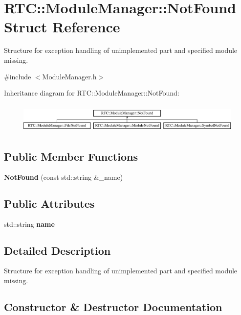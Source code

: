 \section{RTC::ModuleManager::NotFound Struct Reference}
\label{structRTC_1_1ModuleManager_1_1NotFound}


Structure for exception handling of unimplemented part and specified module missing.  




{\ttfamily \#include $<$ModuleManager.h$>$}

Inheritance diagram for RTC::ModuleManager::NotFound:\begin{figure}[H]
\begin{center}
\leavevmode
\includegraphics[height=1.51762cm]{structRTC_1_1ModuleManager_1_1NotFound}
\end{center}
\end{figure}
\subsection*{Public Member Functions}
\begin{DoxyCompactItemize}
\item 
{\bf NotFound} (const std::string \&\_\-name)
\end{DoxyCompactItemize}
\subsection*{Public Attributes}
\begin{DoxyCompactItemize}
\item 
std::string {\bf name}
\end{DoxyCompactItemize}


\subsection{Detailed Description}
Structure for exception handling of unimplemented part and specified module missing. 

\subsection{Constructor \& Destructor Documentation}
